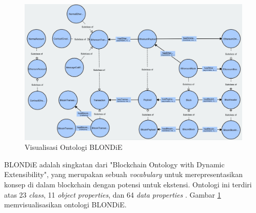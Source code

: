 \begin{figure}[ht]
	\centering
	\includegraphics[width=1\textwidth]{resources/chapter-2/blondie-visualization.jpg}
	\caption{Visualisasi Ontologi BLONDiE \parencite{third2017linked}}
	\label{image:blondie-visualization}
\end{figure}

BLONDiE adalah singkatan dari "Blockchain Ontology with Dynamic Extensibility", yang merupakan sebuah \textit{vocabulary} untuk merepresentasikan konsep di dalam blockchain dengan potensi untuk ekstensi. Ontologi ini terdiri atas 23 \textit{class}, 11 \textit{object properties}, dan 64 \textit{data properties} \parencite{hector2020blondie}. Gambar \ref{image:blondie-visualization} memvisualisasikan ontologi BLONDiE.